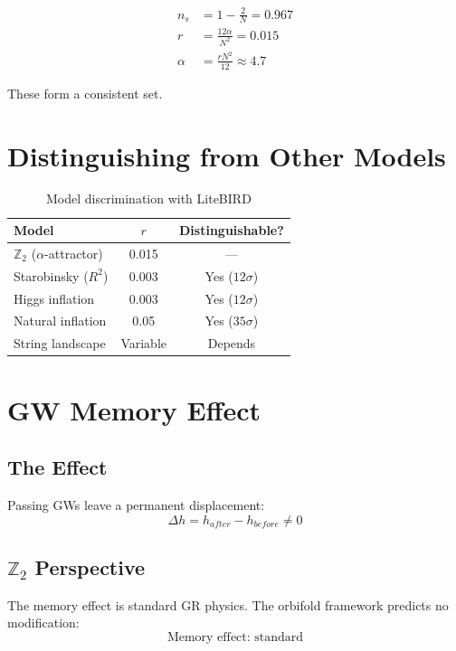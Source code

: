 \documentclass[12pt,a4paper]{article}
\begin{document}
\begin{align}
n_s &= 1 - \frac{2}{N} = 0.967 \\
r &= \frac{12\alpha}{N^2} = 0.015 \\
\alpha &= \frac{rN^2}{12} \approx 4.7
\end{align}

These form a consistent set.

\section{Distinguishing from Other Models}

\begin{table}[h]
\centering
\begin{tabular}{lcc}
\toprule
Model & $r$ & Distinguishable? \\
\midrule
$\mathbb{Z}_2$ ($\alpha$-attractor) & 0.015 & --- \\
Starobinsky ($R^2$) & 0.003 & Yes ($12\sigma$) \\
Higgs inflation & 0.003 & Yes ($12\sigma$) \\
Natural inflation & 0.05 & Yes ($35\sigma$) \\
String landscape & Variable & Depends \\
\bottomrule
\end{tabular}
\caption{Model discrimination with LiteBIRD}
\end{table}

\section{GW Memory Effect}

\subsection{The Effect}

Passing GWs leave a permanent displacement:
\begin{equation}
\Delta h = h_{after} - h_{before} \neq 0
\end{equation}

\subsection{$\mathbb{Z}_2$ Perspective}

The memory effect is standard GR physics. The orbifold framework predicts no modification:
\begin{equation}
\text{Memory effect: standard}
\end{equation}
\end{document}
